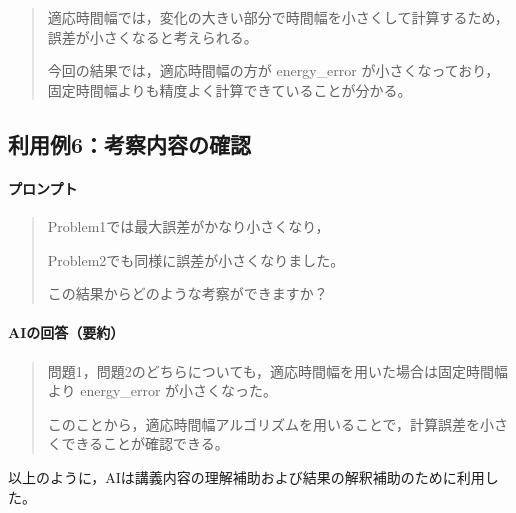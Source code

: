 \documentclass[uplatex,dvipdfmx]{jsarticle}
\begin{document}
\begin{quote}
適応時間幅では，変化の大きい部分で時間幅を小さくして計算するため，誤差が小さくなると考えられる。

今回の結果では，適応時間幅の方が energy\_error が小さくなっており，固定時間幅よりも精度よく計算できていることが分かる。
\end{quote}

\subsection*{利用例6：考察内容の確認}

\paragraph{プロンプト}

\begin{quote}
Problem1では最大誤差がかなり小さくなり，

Problem2でも同様に誤差が小さくなりました。

この結果からどのような考察ができますか？
\end{quote}

\paragraph{AIの回答（要約）}

\begin{quote}
問題1，問題2のどちらについても，適応時間幅を用いた場合は固定時間幅より energy\_error が小さくなった。

このことから，適応時間幅アルゴリズムを用いることで，計算誤差を小さくできることが確認できる。
\end{quote}

以上のように，AIは講義内容の理解補助および結果の解釈補助のために利用した。
\end{document}
